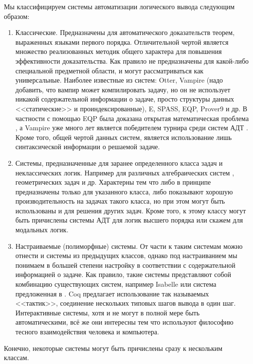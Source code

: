Мы классифицируем системы автоматизации логического вывода следующим образом:
\begin{enumerate}
\item Классические. Предназначены для автоматического доказательств теорем, выраженных языками первого порядка. Отличительной чертой является множество реализованных методик общего характера для повышения эффективности доказательства. Как правило не предназначены для какой-либо специальной предметной области, и могут рассматриваться как универсальные. Наиболее известные из систем: Otter, Vampire (надо добавить, что вампир может компилировать задачу, но он не использует никакой содержательной информации о задаче, просто структуры данных <<статические>> и проиндексированные), E, SPASS, EQP, Prover9 и др.  В частности  с помощью EQP была доказана открытая математическая проблема \cite{McCuneRob}, а Vampire уже много лет является победителем турнира среди систем АДТ \cite{CASC}. Кроме того, общей чертой данных систем, является использование лишь синтаксической информации о решаемой задаче.

\item Системы, предназначенные для заранее определенного класса задач и неклассических логик. Например для различных алгебраических систем \cite{TPTP}, геометрических задач \cite{TPTP} и др. Характерны тем что либо в принципе предназначены только для указанного класса, либо показывают хорошую производительность на задачах такого класса, но при этом могут быть использованы и для решения других задач. Кроме того, к этому классу могут быть причислены системы АДТ для логик высшего порядка или скажем для модальных логик.

\item Настраиваемые (полиморфные) системы. От части к таким системам можно отнести и системы из предыдущих классов, однако под настраиванием мы понимаем в большей степени настройку в соответствии с содержательной информацией о задаче. Как правило, такие системы представляют собой комбинацию существующих систем, например Isabelle \cite{Isabelle} или система предложенная в \cite{TPTPProblemOrientedATP1}. Coq \cite{LaCoq} предлагает использование так называемых <<тактик>>, соединение нескольких типовых шагов вывода в один шаг. Интерактивные системы, хотя и не могут в полной мере быть автоматическими, всё же они интересны тем что используют философию тесного взаимодействия человека и компьютера.
\end{enumerate}
Конечно, некоторые системы могут быть причислены сразу к нескольким классам.


